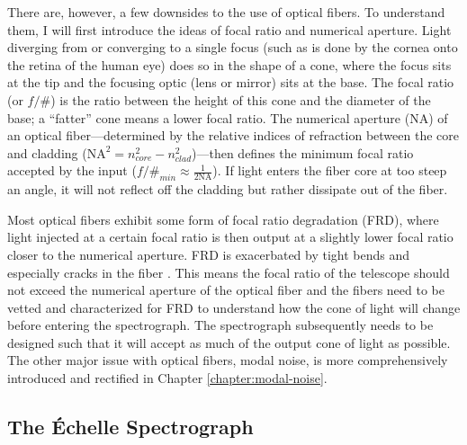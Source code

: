 There are, however, a few downsides to the use of optical fibers. To understand them, I will first introduce the ideas of focal ratio and numerical aperture. Light diverging from or converging to a single focus (such as is done by the cornea onto the retina of the human eye) does so in the shape of a cone, where the focus sits at the tip and the focusing optic (lens or mirror) sits at the base. The focal ratio (or $f/\#$) is the ratio between the height of this cone and the diameter of the base; a ``fatter'' cone means a lower focal ratio. The numerical aperture ($\mathrm{NA}$) of an optical fiber---determined by the relative indices of refraction between the core and cladding ($\mathrm{NA}^2=n_{core}^2-n_{clad}^2$)---then defines the minimum focal ratio accepted by the input ($f/\#_{min} \approx \frac{1}{2\mathrm{NA}}$). If light enters the fiber core at too steep an angle, it will not reflect off the cladding but rather dissipate out of the fiber.

Most optical fibers exhibit some form of focal ratio degradation (FRD), where light injected at a certain focal ratio is then output at a slightly lower focal ratio closer to the numerical aperture. FRD is exacerbated by tight bends and especially cracks in the fiber \citep{ramsey_focal_1988}. This means the focal ratio of the telescope should not exceed the numerical aperture of the optical fiber and the fibers need to be vetted and characterized for FRD to understand how the cone of light will change before entering the spectrograph. The spectrograph subsequently needs to be designed such that it will accept as much of the output cone of light as possible. The other major issue with optical fibers, modal noise, is more comprehensively introduced and rectified in Chapter \ref{chapter:modal-noise}.

\subsection{The \'Echelle Spectrograph} \label{intro:optics:echelle}

